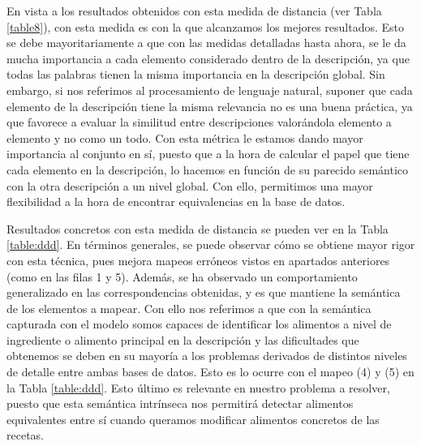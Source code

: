 En vista a los resultados obtenidos con esta medida de distancia (ver Tabla \ref{table8}), con esta medida es con la que alcanzamos los mejores resultados. Esto se debe mayoritariamente a que con las medidas detalladas hasta ahora, se le da mucha importancia a cada elemento considerado dentro de la descripción, ya que todas las palabras tienen la misma importancia en la descripción global. Sin embargo, si nos referimos al procesamiento de lenguaje natural, suponer que cada elemento de la descripción tiene la misma relevancia no es una buena práctica, ya que favorece a evaluar la similitud entre descripciones valorándola elemento a elemento y no como un todo. Con esta métrica le estamos dando mayor importancia al conjunto en sí, puesto que a la hora de calcular el papel que tiene cada elemento en la descripción, lo hacemos en función de su parecido semántico con la otra descripción a un nivel global. Con ello, permitimos una mayor flexibilidad a la hora de encontrar equivalencias en la base de datos. 


Resultados concretos con esta medida de distancia se pueden ver en la Tabla \ref{table:ddd}. En términos generales, se puede observar cómo se obtiene mayor rigor con esta técnica, pues mejora mapeos erróneos vistos en apartados anteriores (como en las filas 1 y 5). Además, se ha observado un comportamiento generalizado en las correspondencias obtenidas, y es que mantiene la semántica de los elementos a mapear. Con ello nos referimos a que con la semántica capturada con el modelo somos capaces de identificar los alimentos a nivel de ingrediente o alimento principal en la descripción y las dificultades que obtenemos se deben en su mayoría a los problemas derivados de distintos niveles de detalle entre ambas bases de datos. Esto es lo ocurre con el mapeo (4) y (5) en la Tabla \ref{table:ddd}. Esto último es relevante en nuestro problema a resolver, puesto que esta semántica intrínseca nos permitirá detectar alimentos equivalentes entre sí cuando queramos modificar alimentos concretos de las recetas.


